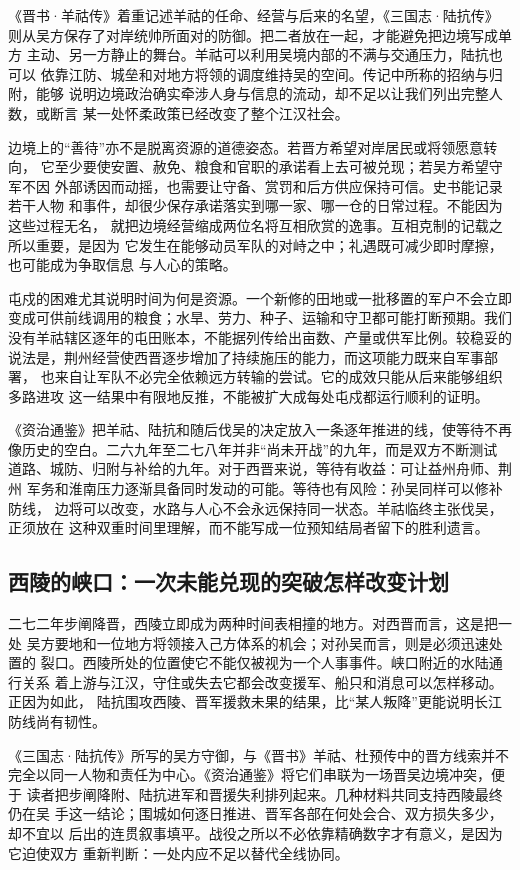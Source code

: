 《晋书·羊祜传》着重记述羊祜的任命、经营与后来的名望，《三国志·陆抗传》
则从吴方保存了对岸统帅所面对的防御。把二者放在一起，才能避免把边境写成单方
主动、另一方静止的舞台。羊祜可以利用吴境内部的不满与交通压力，陆抗也可以
依靠江防、城垒和对地方将领的调度维持吴的空间。传记中所称的招纳与归附，能够
说明边境政治确实牵涉人身与信息的流动，却不足以让我们列出完整人数，或断言
某一处怀柔政策已经改变了整个江汉社会。

边境上的“善待”亦不是脱离资源的道德姿态。若晋方希望对岸居民或将领愿意转向，
它至少要使安置、赦免、粮食和官职的承诺看上去可被兑现；若吴方希望守军不因
外部诱因而动摇，也需要让守备、赏罚和后方供应保持可信。史书能记录若干人物
和事件，却很少保存承诺落实到哪一家、哪一仓的日常过程。不能因为这些过程无名，
就把边境经营缩成两位名将互相欣赏的逸事。互相克制的记载之所以重要，是因为
它发生在能够动员军队的对峙之中；礼遇既可减少即时摩擦，也可能成为争取信息
与人心的策略。

屯戍的困难尤其说明时间为何是资源。一个新修的田地或一批移置的军户不会立即
变成可供前线调用的粮食；水旱、劳力、种子、运输和守卫都可能打断预期。我们
没有羊祜辖区逐年的屯田账本，不能据列传给出亩数、产量或供军比例。较稳妥的
说法是，荆州经营使西晋逐步增加了持续施压的能力，而这项能力既来自军事部署，
也来自让军队不必完全依赖远方转输的尝试。它的成效只能从后来能够组织多路进攻
这一结果中有限地反推，不能被扩大成每处屯戍都运行顺利的证明。

《资治通鉴》把羊祜、陆抗和随后伐吴的决定放入一条逐年推进的线，使等待不再
像历史的空白。二六九年至二七八年并非“尚未开战”的九年，而是双方不断测试
道路、城防、归附与补给的九年。对于西晋来说，等待有收益：可让益州舟师、荆州
军务和淮南压力逐渐具备同时发动的可能。等待也有风险：孙吴同样可以修补防线，
边将可以改变，水路与人心不会永远保持同一状态。羊祜临终主张伐吴，正须放在
这种双重时间里理解，而不能写成一位预知结局者留下的胜利遗言。

\subsection{西陵的峡口：一次未能兑现的突破怎样改变计划}

二七二年步阐降晋，西陵立即成为两种时间表相撞的地方。对西晋而言，这是把一处
吴方要地和一位地方将领接入己方体系的机会；对孙吴而言，则是必须迅速处置的
裂口。西陵所处的位置使它不能仅被视为一个人事事件。峡口附近的水陆通行关系
着上游与江汉，守住或失去它都会改变援军、船只和消息可以怎样移动。正因为如此，
陆抗围攻西陵、晋军援救未果的结果，比“某人叛降”更能说明长江防线尚有韧性。

《三国志·陆抗传》所写的吴方守御，与《晋书》羊祜、杜预传中的晋方线索并不
完全以同一人物和责任为中心。《资治通鉴》将它们串联为一场晋吴边境冲突，便于
读者把步阐降附、陆抗进军和晋援失利排列起来。几种材料共同支持西陵最终仍在吴
手这一结论；围城如何逐日推进、晋军各部在何处会合、双方损失多少，却不宜以
后出的连贯叙事填平。战役之所以不必依靠精确数字才有意义，是因为它迫使双方
重新判断：一处内应不足以替代全线协同。

